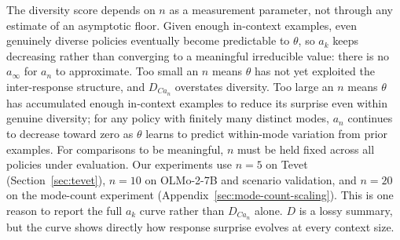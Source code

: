 The diversity score depends on $n$ as a measurement parameter, not through any estimate of an asymptotic floor.
Given enough in-context examples, even genuinely diverse policies eventually become predictable to $\theta$, so $a_k$ keeps decreasing rather than converging to a meaningful irreducible value: there is no $a_\infty$ for $a_n$ to approximate.
Too small an $n$ means $\theta$ has not yet exploited the inter-response structure, and $D_{Ca_n}$ overstates diversity.
Too large an $n$ means $\theta$ has accumulated enough in-context examples to reduce its surprise even within genuine diversity; for any policy with finitely many distinct modes, $a_n$ continues to decrease toward zero as $\theta$ learns to predict within-mode variation from prior examples.
For comparisons to be meaningful, $n$ must be held fixed across all policies under evaluation.
Our experiments use $n = 5$ on Tevet (Section~\ref{sec:tevet}), $n = 10$ on OLMo-2-7B and scenario validation, and $n = 20$ on the mode-count experiment (Appendix~\ref{sec:mode-count-scaling}).
This is one reason to report the full $a_k$ curve rather than $D_{Ca_n}$ alone. $D$ is a lossy summary, but the curve shows directly how response surprise evolves at every context size.

